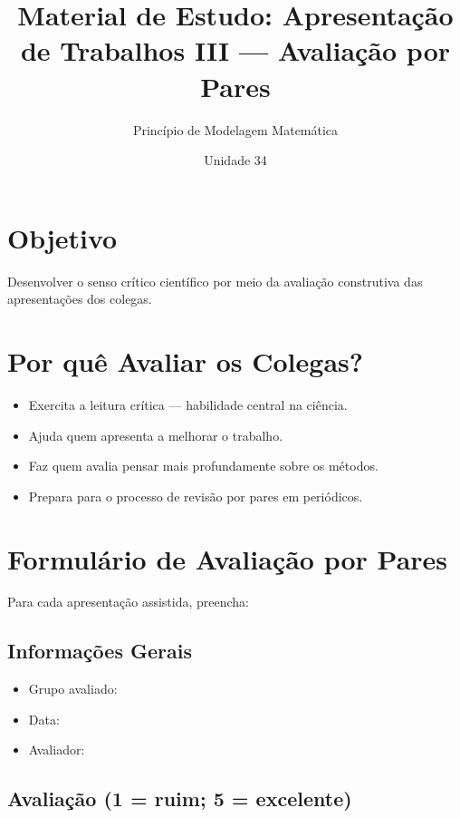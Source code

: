 \documentclass[12pt,a4paper]{article}
\title{Material de Estudo: Apresenta\c{c}\~ao de Trabalhos III --- Avalia\c{c}\~ao por Pares}
\author{Princ\'ipio de Modelagem Matem\'atica}
\date{Unidade 34}
\begin{document}
\maketitle

\section*{Objetivo}
Desenvolver o senso cr\'itico cient\'ifico por meio da avalia\c{c}\~ao construtiva das apresenta\c{c}\~oes dos colegas.

\section*{Por qu\^e Avaliar os Colegas?}

\begin{itemize}
  \item Exercita a leitura cr\'itica --- habilidade central na ci\^encia.
  \item Ajuda quem apresenta a melhorar o trabalho.
  \item Faz quem avalia pensar mais profundamente sobre os m\'etodos.
  \item Prepara para o processo de revis\~ao por pares em peri\'odicos.
\end{itemize}

\section*{Formul\'ario de Avalia\c{c}\~ao por Pares}

Para cada apresenta\c{c}\~ao assistida, preencha:

\subsection*{Informa\c{c}\~oes Gerais}
\begin{itemize}
  \item Grupo avaliado: \underline{\hspace{6cm}}
  \item Data: \underline{\hspace{4cm}}
  \item Avaliador: \underline{\hspace{5cm}}
\end{itemize}

\subsection*{Avalia\c{c}\~ao (1 = ruim; 5 = excelente)}
\end{document}
